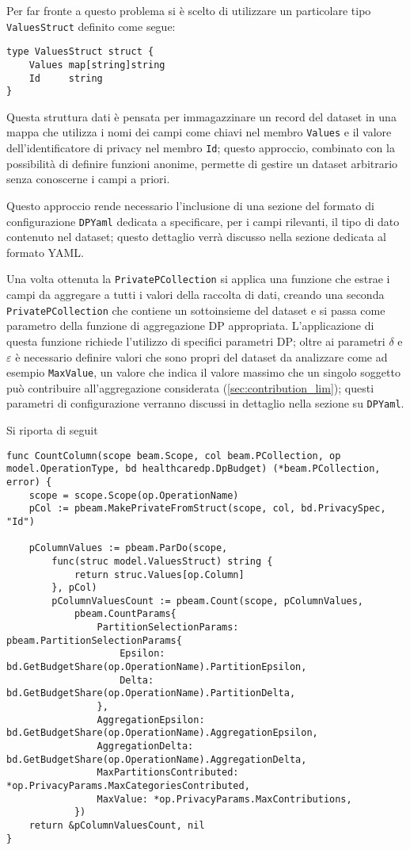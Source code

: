 Per far fronte a questo problema si è scelto di utilizzare un particolare tipo \texttt{ValuesStruct} definito come segue:
\begin{verbatim}
type ValuesStruct struct {
	Values map[string]string
	Id     string
}
\end{verbatim}
Questa struttura dati è pensata per immagazzinare un record del dataset in una mappa che utilizza i nomi dei campi come chiavi nel membro \texttt{Values} e il valore dell'identificatore di privacy nel membro \texttt{Id}; questo approccio, combinato con la possibilità di definire funzioni anonime, permette di gestire un dataset arbitrario senza conoscerne i campi a priori.

Questo approccio rende necessario l'inclusione di una sezione del formato di configurazione \texttt{DPYaml} dedicata a specificare, per i campi rilevanti, il tipo di dato contenuto nel dataset; questo dettaglio verrà discusso nella sezione dedicata al formato YAML.

Una volta ottenuta la \texttt{PrivatePCollection} si applica una funzione che estrae i campi da aggregare a tutti i valori della raccolta di dati, creando una seconda \texttt{PrivatePCollection} che contiene un sottoinsieme del dataset e si passa come parametro della funzione di aggregazione DP appropriata. L'applicazione di questa funzione richiede l'utilizzo di specifici parametri DP; oltre ai parametri $\delta$ e $\varepsilon$ è necessario definire valori che sono propri del dataset da analizzare come ad esempio \texttt{MaxValue}, un valore che indica il valore massimo che un singolo soggetto può contribuire all'aggregazione considerata (\ref{sec:contribution_lim}); questi parametri di configurazione verranno discussi in dettaglio nella sezione su \texttt{DPYaml}.

Si riporta di seguit

\begin{verbatim}
func CountColumn(scope beam.Scope, col beam.PCollection, op model.OperationType, bd healthcaredp.DpBudget) (*beam.PCollection, error) {
	scope = scope.Scope(op.OperationName)
	pCol := pbeam.MakePrivateFromStruct(scope, col, bd.PrivacySpec, "Id")

	pColumnValues := pbeam.ParDo(scope,
		func(struc model.ValuesStruct) string {
			return struc.Values[op.Column]
		}, pCol)
        pColumnValuesCount := pbeam.Count(scope, pColumnValues,
            pbeam.CountParams{
                PartitionSelectionParams: pbeam.PartitionSelectionParams{
                    Epsilon: bd.GetBudgetShare(op.OperationName).PartitionEpsilon,
                    Delta:   bd.GetBudgetShare(op.OperationName).PartitionDelta,
                },
                AggregationEpsilon: bd.GetBudgetShare(op.OperationName).AggregationEpsilon,
                AggregationDelta: bd.GetBudgetShare(op.OperationName).AggregationDelta,
                MaxPartitionsContributed: *op.PrivacyParams.MaxCategoriesContributed,
                MaxValue: *op.PrivacyParams.MaxContributions,
            })
	return &pColumnValuesCount, nil
}
\end{verbatim}


